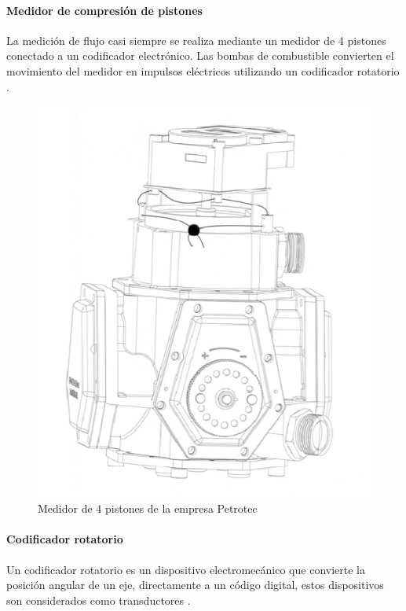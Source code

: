 \paragraph{Medidor de compresión de pistones}La medición de flujo casi siempre se realiza mediante un medidor de 4 pistones conectado a un codificador electrónico. Las bombas de combustible convierten el movimiento del medidor en impulsos eléctricos utilizando un codificador rotatorio \citep{MarcoTeorico5}.

\begin{figure}[H]
	\centering
	\includegraphics[scale=.4]{Capitulo2/images/medidor_gasolina}
	\caption{Medidor de 4 pistones de la empresa Petrotec}
	\label{fig:medidor_gasolina}
\end{figure}

\paragraph{Codificador rotatorio}
Un codificador rotatorio es un dispositivo electromecánico que convierte la posición angular de un eje, directamente a un código digital, estos dispositivos son considerados como transductores \citep{MarcoTeorico6}.

